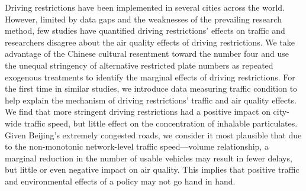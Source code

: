 Driving restrictions have been implemented in several cities across the world. However, limited by data gaps and the weaknesses of the prevailing research method, few studies have quantified driving restrictions' effects on traffic and researchers disagree about the air quality effects of driving restrictions. We take advantage of the Chinese cultural resentment toward the number four and use the unequal stringency of alternative restricted plate numbers as repeated exogenous treatments to identify the marginal effects of driving restrictions. For the first time in similar studies, we introduce data measuring traffic condition to help explain the mechanism of driving restrictions' traffic and air quality effects. We find that more stringent driving restrictions had a positive impact on city-wide traffic speed, but little effect on the concentration of inhalable particulates. Given Beijing's extremely congested roads, we consider it most plausible that due to the non-monotonic network-level traffic speed—volume relationship, a marginal reduction in the number of usable vehicles may result in fewer delays, but little or even negative impact on air quality. This implies that positive traffic and environmental effects of a policy may not go hand in hand.
